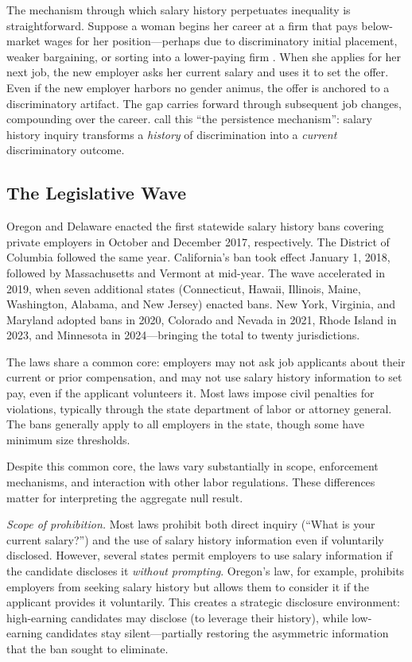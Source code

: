 \documentclass[12pt]{article}
\begin{document}
The mechanism through which salary history perpetuates inequality is straightforward. Suppose a woman begins her career at a firm that pays below-market wages for her position---perhaps due to discriminatory initial placement, weaker bargaining, or sorting into a lower-paying firm \citep{card2016bargaining}. When she applies for her next job, the new employer asks her current salary and uses it to set the offer. Even if the new employer harbors no gender animus, the offer is anchored to a discriminatory artifact. The gap carries forward through subsequent job changes, compounding over the career. \citet{hansen2020information} call this ``the persistence mechanism'': salary history inquiry transforms a \textit{history} of discrimination into a \textit{current} discriminatory outcome.

\subsection{The Legislative Wave}

Oregon and Delaware enacted the first statewide salary history bans covering private employers in October and December 2017, respectively. The District of Columbia followed the same year. California's ban took effect January 1, 2018, followed by Massachusetts and Vermont at mid-year. The wave accelerated in 2019, when seven additional states (Connecticut, Hawaii, Illinois, Maine, Washington, Alabama, and New Jersey) enacted bans. New York, Virginia, and Maryland adopted bans in 2020, Colorado and Nevada in 2021, Rhode Island in 2023, and Minnesota in 2024---bringing the total to twenty jurisdictions.

The laws share a common core: employers may not ask job applicants about their current or prior compensation, and may not use salary history information to set pay, even if the applicant volunteers it. Most laws impose civil penalties for violations, typically through the state department of labor or attorney general. The bans generally apply to all employers in the state, though some have minimum size thresholds.

Despite this common core, the laws vary substantially in scope, enforcement mechanisms, and interaction with other labor regulations. These differences matter for interpreting the aggregate null result.

\textit{Scope of prohibition.} Most laws prohibit both direct inquiry (``What is your current salary?'') and the use of salary history information even if voluntarily disclosed. However, several states permit employers to use salary information if the candidate discloses it \textit{without prompting}. Oregon's law, for example, prohibits employers from seeking salary history but allows them to consider it if the applicant provides it voluntarily. This creates a strategic disclosure environment: high-earning candidates may disclose (to leverage their history), while low-earning candidates stay silent---partially restoring the asymmetric information that the ban sought to eliminate.
\end{document}
